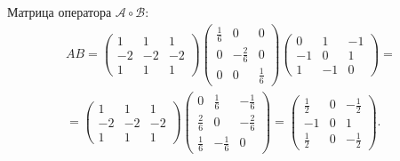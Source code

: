 \documentclass[12pt]{article}
\begin{document}
    Матрица оператора $\mathcal{A} \circ \mathcal{B}$:
    \begin{multline*}
        A B =
        \begin{pmatrix}
            1  & 1  & 1  \\
            -2 & -2 & -2 \\
            1  & 1  & 1
        \end{pmatrix}
        \begin{pmatrix}
            \frac{1}{6} & 0             & 0           \\
            0           & - \frac{2}{6} & 0           \\
            0           & 0             & \frac{1}{6}
        \end{pmatrix}
        \begin{pmatrix}
            0  & 1  & -1 \\
            -1 & 0  & 1  \\
            1  & -1 & 0
        \end{pmatrix} = \\
        =
        \begin{pmatrix}
            1  & 1  & 1  \\
            -2 & -2 & -2 \\
            1  & 1  & 1
        \end{pmatrix}
        \begin{pmatrix}
            0           & \frac{1}{6}  & - \frac{1}{6} \\
            \frac{2}{6} & 0            & -\frac{2}{6}  \\
            \frac{1}{6} & -\frac{1}{6} & 0
        \end{pmatrix}
        =
        \begin{pmatrix}
            \frac{1}{2} & 0 & - \frac{1}{2} \\
            - 1         & 0 & 1             \\
            \frac{1}{2} & 0 & - \frac{1}{2}
        \end{pmatrix} .
    \end{multline*}
\end{document}
